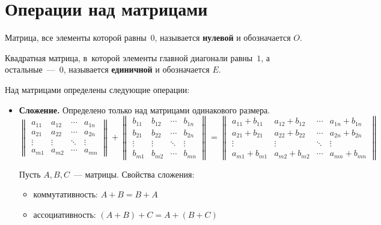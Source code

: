 \section{Операции над матрицами}
Матрица, все элементы которой равны~$0$, называется \textbf{нулевой} и обозначается $O$.

Квадратная матрица, в~которой элементы главной диагонали равны~$1$, а остальные~---~$0$, называется \textbf{единичной} и обозначается $E$.

Над матрицами определены следующие операции:
\begin{itemize}
	\item\textbf{Сложение.}
	Определено только над матрицами одинакового размера.
	\begin{equation*}
	\begin{Vmatrix}
	a_{11} & a_{12} & \cdots & a_{1n} \\ 
	a_{21} & a_{22} & \cdots & a_{2n} \\ 
	\vdots & \vdots & \ddots & \vdots \\ 
	a_{m1} & a_{m2} & \cdots & a_{mn}
	\end{Vmatrix} +
	\begin{Vmatrix}
	b_{11} & b_{12} & \cdots & b_{1n} \\ 
	b_{21} & b_{22} & \cdots & b_{2n} \\ 
	\vdots & \vdots & \ddots & \vdots \\ 
	b_{m1} & b_{m2} & \cdots & b_{mn}
	\end{Vmatrix} =
	\begin{Vmatrix}
	a_{11} + b_{11} & a_{12} + b_{12} & \cdots & a_{1n} + b_{1n} \\ 
	a_{21} + b_{21} & a_{22} + b_{22} & \cdots & a_{2n} + b_{2n} \\ 
	\vdots & \vdots & \ddots & \vdots \\ 
	a_{m1} + b_{m1} & a_{m2} + b_{m2} & \cdots & a_{mn} + b_{mn}
	\end{Vmatrix}
	\end{equation*}
	
	Пусть $A, B, C$~--- матрицы. Свойства сложения:
	\begin{itemize}
		\item коммутативность:
		$A + B = B + A$
		\item ассоциативность:
		$(A + B) + C = A + (B + C)$
	\end{itemize}
	

\end{itemize}
